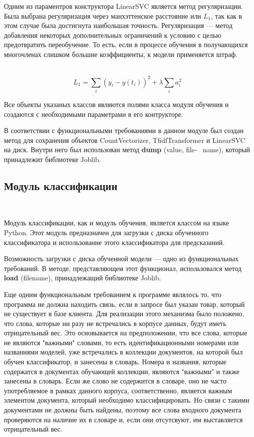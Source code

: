 Одним из параментров конструктора LinearSVC является метод регуляризации. Была выбрана регуляризация через манхэттенское расстояние или $L_{1}$, так как в этом случае была достигнута наибольшая точность. Регуляризация — метод добавления некоторых дополнительных ограничений к условию с целью предотвратить переобучение. То есть, если в процессе обучения в получающихся многочленах слишком большие коэффициенты, к модели применяется штраф.

\
$$L_{1} = \sum_{i}(y_{i} - y(t_{i}))^2 + \lambda\sum_{i}a_{i}^2$$\normalsize

Все объекты указаных классов являются полями класса модуля обучения и создаются с необходимыми параметрами в его контрукторе.

В соответствии с функциональными требованиями в данном модуле был создан метод для сохранения объектов CountVectorizer, TfidfTransformer и LinearSVC на диск. Внутри него был использован метод \textbf{dump} (value, file-
\
name), который принадлежит библиотеке Joblib\cite{Joblib}.

\newpage

\subsection{Модуль классификации}
\

Модуль классификации, как и модуль обучения, является классом на языке Python. Этот модуль предназначен для загрузки с диска обученного классификатора и использование этого классификатора для предсказаний. 

Возможность загрузки с диска обученной модели — одно из функциональных требований. В методе, представляющем этот функционал, использовался метод \textbf{load} (filename), принадлежащий библиотеке Joblib\cite{Joblib}.

Еще одним функциональным требованием к программе являлось то, что программа не должна находить связь, если в запросе был указан товар, который не существует в базе клиента. Для реализации этого механизма было положено, что слова, которые ни разу не встречались в корпусе данных, будут иметь отрицательный вес. Это основывается на предположении, что все слова, которые не являются "важными" словами, то есть идентификационными номерами или названиями моделей, уже встречались в коллекции документов, на которой был обучен классификатор, и занесены в словарь. Номера и названия, которые содержатся в документах обучающей коллекции, являются "важными" и также занесены в словарь. Если же слово не содержится в словаре, оно не часто употребляемое в рамках данного корпуса, соответственно, является важным элементом документа, который необходимо классифицировать. Но связи с такими документами не должны быть найдены, поэтому все слова входного документа проверяются на наличие их в словаре и, если они отсутсвуют, им выставляется отрицательный вес.

